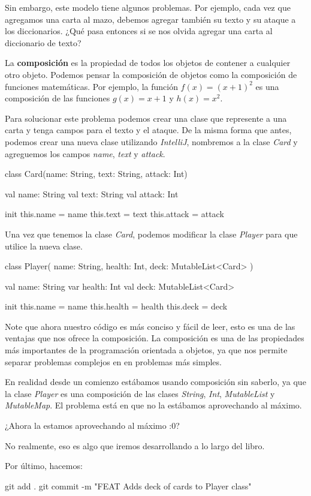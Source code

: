   Sin embargo, este modelo tiene algunos problemas.
  Por ejemplo, cada vez que agregamos una carta al mazo, debemos agregar también su texto y su
  ataque a los diccionarios.
  ¿Qué pasa entonces si se nos olvida agregar una carta al diccionario de texto?

  \begin{defaultbox}[Composición]
    La \textbf{composición} es la propiedad de todos los objetos de contener a 
    cualquier otro objeto.
    Podemos pensar la composición de objetos como la composición de funciones matemáticas.
    Por ejemplo, la función \(f(x) = (x + 1)^2\) es una composición de las funciones
    \(g(x) = x + 1\) y \(h(x) = x^2\).
  \end{defaultbox}

  Para solucionar este problema podemos crear una clase que represente a una carta y tenga campos
  para el texto y el ataque.
  De la misma forma que antes, podemos crear una nueva clase utilizando \textit{IntelliJ}, 
  nombremos a la clase \textit{Card} y agreguemos los campos \textit{name}, \textit{text} y
  \textit{attack}.

  \begin{kotlin}
    class Card(name: String, text: String, attack: Int) {
      val name: String
      val text: String
      val attack: Int

      init {
        this.name = name
        this.text = text
        this.attack = attack
      }
    }
  \end{kotlin}

  Una vez que tenemos la clase \textit{Card}, podemos modificar la clase \textit{Player} para que
  utilice la nueva clase.

  \begin{kotlin}
    class Player(
      name: String,
      health: Int,
      deck: MutableList<Card>
    ) {
      val name: String
      var health: Int
      val deck: MutableList<Card>

      init {
        this.name = name
        this.health = health
        this.deck = deck
      }
    }
  \end{kotlin}

  Note que ahora nuestro código es más conciso y fácil de leer, esto es una de las ventajas que
  nos ofrece la composición.
  La composición es una de las propiedades más importantes de la programación orientada a objetos,
  ya que nos permite separar problemas complejos en en problemas más simples.

  En realidad desde un comienzo estábamos usando composición sin saberlo, ya que la clase 
  \textit{Player} es una composición de las clases \textit{String}, \textit{Int}, 
  \textit{MutableList} y \textit{MutableMap}.
  El problema está en que no la estábamos aprovechando al máximo.

  \begin{center}
    ¿Ahora la estamos aprovechando al máximo :0?
  \end{center}

  No realmente, eso es algo que iremos desarrollando a lo largo del libro.

  Por último, hacemos:

  \begin{powershell}
    git add .
    git commit -m "FEAT Adds deck of cards to Player class"
  \end{powershell}
